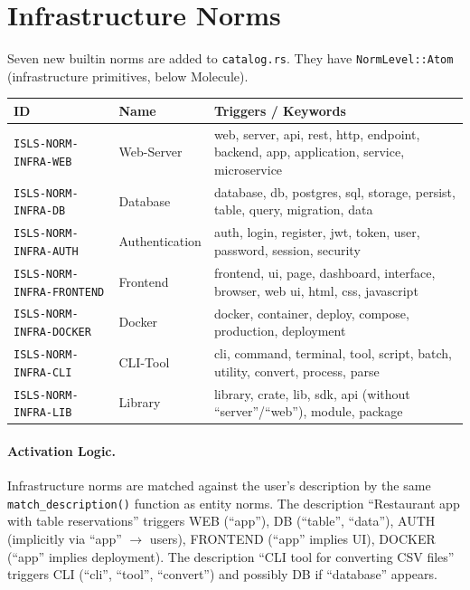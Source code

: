 \documentclass[11pt,a4paper]{article}
\begin{document}
\section{Infrastructure Norms}
\label{sec:infra-norms}

Seven new builtin norms are added to \texttt{catalog.rs}. They have 
\texttt{NormLevel::Atom} (infrastructure primitives, below Molecule).

\begin{longtable}{llp{6cm}}
\toprule
\textbf{ID} & \textbf{Name} & \textbf{Triggers / Keywords} \\
\midrule
\texttt{ISLS-NORM-INFRA-WEB} & Web-Server 
  & web, server, api, rest, http, endpoint, backend, app, 
    application, service, microservice \\
\texttt{ISLS-NORM-INFRA-DB} & Database 
  & database, db, postgres, sql, storage, persist, table, 
    query, migration, data \\
\texttt{ISLS-NORM-INFRA-AUTH} & Authentication 
  & auth, login, register, jwt, token, user, password, 
    session, security \\
\texttt{ISLS-NORM-INFRA-FRONTEND} & Frontend 
  & frontend, ui, page, dashboard, interface, browser, web ui, 
    html, css, javascript \\
\texttt{ISLS-NORM-INFRA-DOCKER} & Docker 
  & docker, container, deploy, compose, production, 
    deployment \\
\texttt{ISLS-NORM-INFRA-CLI} & CLI-Tool 
  & cli, command, terminal, tool, script, batch, utility, 
    convert, process, parse \\
\texttt{ISLS-NORM-INFRA-LIB} & Library 
  & library, crate, lib, sdk, api (without ``server''/``web''),
    module, package \\
\bottomrule
\end{longtable}

\paragraph{Activation Logic.} Infrastructure norms are matched against 
the user's description by the same \texttt{match\_description()} 
function as entity norms. The description ``Restaurant app with table 
reservations'' triggers WEB (``app''), DB (``table'', ``data''), AUTH 
(implicitly via ``app'' $\to$ users), FRONTEND (``app'' implies UI), 
DOCKER (``app'' implies deployment). The description ``CLI tool for 
converting CSV files'' triggers CLI (``cli'', ``tool'', ``convert'')
and possibly DB if ``database'' appears.
\end{document}
